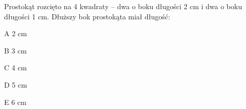 \begin{tresc}
Prostokąt rozcięto na 4 kwadraty – dwa o boku długości 2 cm i dwa o boku długości 1 cm. Dłuższy bok prostokąta miał długość:
\end{tresc}
\begin{wariant}{A} 2 cm \end{wariant}
\begin{wariant}{B} 3 cm \end{wariant}
\begin{wariant}{C} 4 cm \end{wariant}
\begin{wariant}{D} 5 cm \end{wariant}
\begin{wariant}{E} 6 cm \end{wariant}
